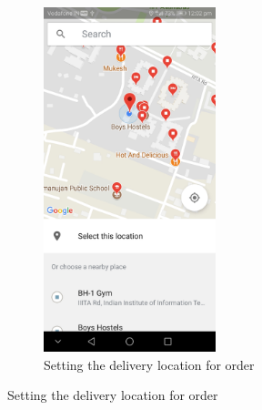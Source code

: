 \documentclass{report}
\begin{document}
\begin{figure}[h!]
\begin{subfigure}[h!]{.3\textwidth}
\includegraphics[width=5cm]{place_picker.jpg}
\caption{\centering \tiny Setting the delivery location for order}
\end{subfigure}


\end{figure}
\end{document}

